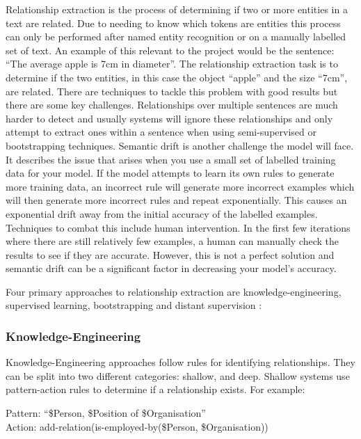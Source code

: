 \documentclass[11pt,oneside]{book}
\begin{document}
Relationship extraction is the process of determining if two or more entities in a text are related. Due to needing to know which tokens are entities this process can only be performed after named entity recognition or on a manually labelled set of text. An example of this relevant to the project would be the sentence: “The average apple is 7cm in diameter”. The relationship extraction task is to determine if the two entities, in this case the object “apple” and the size “7cm”, are related. There are techniques to tackle this problem with good results but there are some key challenges. Relationships over multiple sentences are much harder to detect and usually systems will ignore these relationships and only attempt to extract ones within a sentence when using semi-supervised or bootstrapping techniques. Semantic drift is another challenge the model will face. It describes the issue that arises when you use a small set of labelled training data for your model. If the model attempts to learn its own rules to generate more training data, an incorrect rule will generate more incorrect examples which will then generate more incorrect rules and repeat exponentially. This causes an exponential drift away from the initial accuracy of the labelled examples. Techniques to combat this include human intervention. In the first few iterations where there are still relatively few examples, a human can manually check the results to see if they are accurate. However, this is not a perfect solution and semantic drift can be a significant factor in decreasing your model’s accuracy.

Four primary approaches to relationship extraction are knowledge-engineering, supervised learning, bootstrapping and distant supervision \citep{text_processing_lecture_6}:

\subsubsection{Knowledge-Engineering}

Knowledge-Engineering approaches follow rules for identifying relationships. They can be split into two different categories: shallow, and deep. Shallow systems use pattern-action rules to determine if a relationship exists. For example:

\begin{displayquote}
Pattern: “\$Person, \$Position of \$Organisation”
\\Action: add-relation(is-employed-by(\$Person, \$Organisation))
\end{displayquote}
\end{document}
